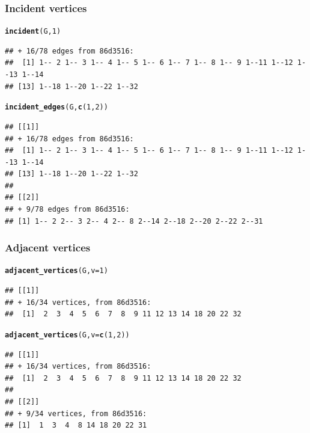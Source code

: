 \documentclass[aspectratio=169]{beamer}\usepackage[]{graphicx}\usepackage[]{xcolor}
\makeatletter
\newcommand{\hlnum}[1]{\textcolor[rgb]{0.686,0.059,0.569}{#1}}%
\newcommand{\hldef}[1]{\textcolor[rgb]{0.345,0.345,0.345}{#1}}%
\newcommand{\hlkwc}[1]{\textcolor[rgb]{0.333,0.667,0.333}{#1}}%
\newcommand{\hlkwd}[1]{\textcolor[rgb]{0.737,0.353,0.396}{\textbf{#1}}}%
\newenvironment{kframe}{%
 \def\at@end@of@kframe{}%
 \ifinner\ifhmode%
  \def\at@end@of@kframe{\end{minipage}}%
  \begin{minipage}{\columnwidth}%
 \fi\fi%
 \def\FrameCommand##1{\hskip\@totalleftmargin \hskip-\fboxsep
 \colorbox{shadecolor}{##1}\hskip-\fboxsep
     \hskip-\linewidth \hskip-\@totalleftmargin \hskip\columnwidth}%
 \MakeFramed {\advance\hsize-\width
   \@totalleftmargin\z@ \linewidth\hsize
   \@setminipage}}%
 {\par\unskip\endMakeFramed%
 \at@end@of@kframe}
\newenvironment{knitrout}{}{} %
\makeatother
\begin{document}
\begin{frame}[fragile]\frametitle{Incident vertices}
\begin{knitrout}
\color{fgcolor}\begin{kframe}
\begin{alltt}
\hlkwd{incident}\hldef{(G,} \hlnum{1}\hldef{)}
\end{alltt}
\begin{verbatim}
## + 16/78 edges from 86d3516:
##  [1] 1-- 2 1-- 3 1-- 4 1-- 5 1-- 6 1-- 7 1-- 8 1-- 9 1--11 1--12 1--13 1--14
## [13] 1--18 1--20 1--22 1--32
\end{verbatim}
\begin{alltt}
\hlkwd{incident_edges}\hldef{(G,} \hlkwd{c}\hldef{(}\hlnum{1}\hldef{,} \hlnum{2}\hldef{))}
\end{alltt}
\begin{verbatim}
## [[1]]
## + 16/78 edges from 86d3516:
##  [1] 1-- 2 1-- 3 1-- 4 1-- 5 1-- 6 1-- 7 1-- 8 1-- 9 1--11 1--12 1--13 1--14
## [13] 1--18 1--20 1--22 1--32
## 
## [[2]]
## + 9/78 edges from 86d3516:
## [1] 1-- 2 2-- 3 2-- 4 2-- 8 2--14 2--18 2--20 2--22 2--31
\end{verbatim}
\end{kframe}
\end{knitrout}
\end{frame}

\begin{frame}[fragile]\frametitle{Adjacent vertices}
\begin{knitrout}
\color{fgcolor}\begin{kframe}
\begin{alltt}
\hlkwd{adjacent_vertices}\hldef{(G,} \hlkwc{v} \hldef{=} \hlnum{1}\hldef{)}
\end{alltt}
\begin{verbatim}
## [[1]]
## + 16/34 vertices, from 86d3516:
##  [1]  2  3  4  5  6  7  8  9 11 12 13 14 18 20 22 32
\end{verbatim}
\begin{alltt}
\hlkwd{adjacent_vertices}\hldef{(G,} \hlkwc{v} \hldef{=} \hlkwd{c}\hldef{(}\hlnum{1}\hldef{,} \hlnum{2}\hldef{))}
\end{alltt}
\begin{verbatim}
## [[1]]
## + 16/34 vertices, from 86d3516:
##  [1]  2  3  4  5  6  7  8  9 11 12 13 14 18 20 22 32
## 
## [[2]]
## + 9/34 vertices, from 86d3516:
## [1]  1  3  4  8 14 18 20 22 31
\end{verbatim}
\end{kframe}
\end{knitrout}
\end{frame}
\end{document}
